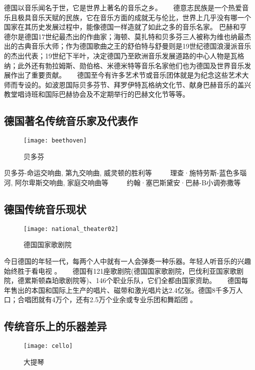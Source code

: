     德国以音乐闻名于世，它是世界上著名的音乐之乡。 
    
    德意志民族是一个热爱音乐且极具音乐天赋的民族，它在音乐方面的成就无与伦比，世界上几乎没有哪一个国家在其历史发展过程中，能像德国一样造就了如此之多的音乐名家。 巴赫和亨德尔是德国17世纪最杰出的作曲家；海顿、莫扎特和贝多芬三人被称为维也纳最杰出的古典音乐大师；作为德国歌曲之王的舒伯特与舒曼则是19世纪德国浪漫派音乐的杰出代表；19世纪下半叶，决定德国乃至欧洲音乐发展道路的中心人物是瓦格纳；此外还有勃拉姆斯、勋伯格、米德米特等音乐名家他们也为德国及世界音乐发展作出了重要贡献。 
   
    德国至今有许多艺术节或音乐团体就是为纪念这些艺术大师而专设的。如波恩国际贝多芬节、拜罗伊特瓦格纳文化节、献身巴赫音乐的盖兴教堂唱诗班和国际巴赫协会及不定期举行的巴赫文化节等等。 

\subsection{德国著名传统音乐家及代表作}

\begin{figure}[htb]
    \centering
    \texttt{[image: beethoven]}
    \caption{贝多芬}
\end{figure}

    贝多芬-命运交响曲, 第九交响曲, 威灵顿的胜利等 
   
    理查·施特劳斯-蓝色多瑙河, 阿尔卑斯交响曲, 家庭交响曲等 
   
    约翰·塞巴斯黛安·巴赫-B小调弥撒等 

\subsection{德国传统音乐现状}
\begin{figure}[htb]
    \centering
    \texttt{[image: national\_theater02]}
    \caption{德国国家歌剧院}
\end{figure}

    今日德国的年轻一代，每两个人中就有一人会弹奏一种乐器。年轻人听音乐的兴趣始终胜于看电视 。 
    
    德国有121座歌剧院(德国国家歌剧院，巴伐利亚国家歌剧院，德累斯顿森珀歌剧院等)、146个职业乐队，它们全都由国家资助。 
  
    德国每年售出的本国和国际上生产的唱片、磁带和激光唱片达2.4亿张。德国8千多万人口；合唱团就有4万个，还有2.5万个业余或专业乐团和舞蹈团 。 

\subsection{传统音乐上的乐器差异}
\begin{figure}[htb]
    \centering
    \texttt{[image: cello]}
    \caption{大提琴}
\end{figure}

